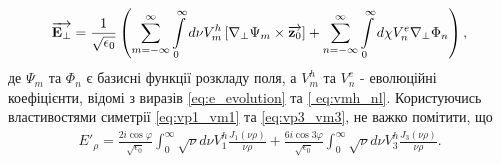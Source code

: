 \begin{equation} \begin{aligned}
\overrightarrow{\mathbf E_\perp} = \frac{1}{\sqrt{\epsilon_0}} \left( 
\sum \limits_{m=-\infty}^{\infty} \int \limits_{0}^{\infty} 
d \nu V_m^h \left[  \nabla_\perp \Psi_m  \times  \overrightarrow{\mathbf z_0}  \right] +
\sum \limits_{n=-\infty}^{\infty} \int \limits_{0}^{\infty}
d \chi V_n^e \nabla_\perp \Phi_n \right),
\end{aligned} \end{equation}
%
де $ \Psi_m $ та $ \Phi_n  $ є базисні функції розкладу поля, а $ V_m^h $
та $ V_n^e $ - еволюційні коефіцієнти, відомі з виразів \eqref{eq:e_evolution}
та \eqref{ eq:vmh_nl}. Користуючись властивостями симетрії 
\eqref{eq:vp1_vm1} та \eqref{eq:vp3_vm3}, не важко помітити, що
%
%
%
%
\begin{equation} \begin{aligned}
E'_\rho = \frac{2 i \cos \varphi}{\sqrt{\epsilon_0}}
\int_0^\infty \sqrt{\nu} d \nu V_1^h \frac{J_1(\nu \rho)}{\nu \rho} +
\frac{6 i \cos 3 \varphi}{\sqrt{\epsilon_0}}
\int_0^\infty \sqrt{\nu} d \nu V_3^h \frac{J_3(\nu \rho)}{\nu \rho}.
\end{aligned} \end{equation}

